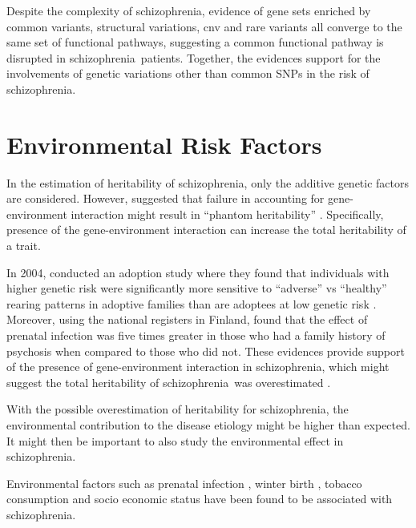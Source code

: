 \documentclass[12pt]{scrbook}
\newcommand*{\scz}{schizophrenia}
\begin{document}
Despite the complexity of \scz, evidence of gene sets enriched by common variants, structural variations, \gls{cnv} and rare variants all converge to the same set of functional pathways, suggesting a common functional pathway is disrupted in \scz\ patients. 
Together, the evidences support for the involvements of genetic variations other than common \glspl{SNP} in the risk of \scz.

\section{Environmental Risk Factors}
In the estimation of heritability of \scz, only the additive genetic factors are considered. 
However, \citet{zuk2012mystery} suggested that failure in accounting for gene-environment interaction might result in ``phantom heritability'' \citep{zuk2012mystery}.
Specifically, presence of the gene-environment interaction can increase the total heritability of a trait.

In 2004, \citet{Tienari2004} conducted an adoption study where they found that individuals with higher genetic risk were significantly more sensitive to ``adverse'' vs ``healthy'' rearing patterns in adoptive families than are adoptees at low genetic risk \citep{Tienari2004}.
Moreover, using the national registers in Finland, \citet{Clarke2009} found that the effect of prenatal infection was five times greater in those who had a family history of psychosis when compared to those who did not. 
These evidences provide support of the presence of gene-environment interaction in \scz, which might suggest the total heritability of \scz\ was overestimated \citep{zuk2012mystery}.

With the possible overestimation of heritability for \scz, the environmental contribution to the disease etiology might be higher than expected. 
It might then be important to also study the environmental effect in \scz.

Environmental factors such as prenatal infection \citep{Brown2010}, winter birth \citep{o1991season}, tobacco consumption \citep{Kelly1999} and socio economic status \citep{McGrath2008a} have been found to be associated with \scz.
\end{document}
